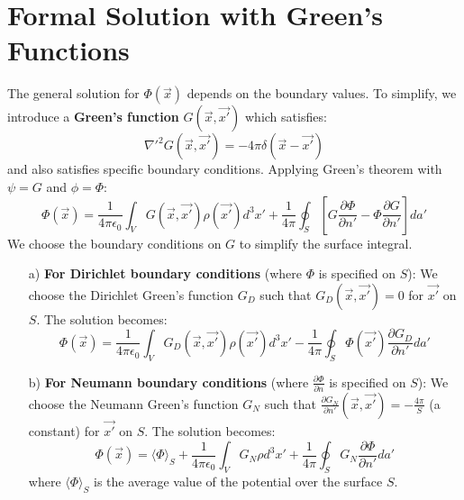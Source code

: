 \documentclass[12pt, a4paper]{article}
\begin{document}
	\section{Formal Solution with Green's Functions}
	The general solution for $\Phi(\vec{x})$ depends on the boundary values. To simplify, we introduce a \textbf{Green's function} $G(\vec{x}, \vec{x'})$ which satisfies:
	\begin{equation*}
		\nabla'^2 G(\vec{x}, \vec{x'}) = -4\pi\delta(\vec{x}-\vec{x'})
	\end{equation*}
	and also satisfies specific boundary conditions. Applying Green's theorem with $\psi = G$ and $\phi = \Phi$:
	\begin{equation*}
		\Phi(\vec{x}) = \frac{1}{4\pi\epsilon_0} \int_V G(\vec{x},\vec{x'}) \rho(\vec{x'}) d^3x' + \frac{1}{4\pi} \oint_S \left[G \frac{\partial\Phi}{\partial n'} - \Phi \frac{\partial G}{\partial n'}\right] da'
	\end{equation*}
	We choose the boundary conditions on $G$ to simplify the surface integral.
	\begin{enumerate}
		\item[a)] \textbf{For Dirichlet boundary conditions} (where $\Phi$ is specified on $S$): We choose the Dirichlet Green's function $G_D$ such that $G_D(\vec{x}, \vec{x'}) = 0$ for $\vec{x'}$ on $S$. The solution becomes:
		\begin{equation}
			\boxed{
				\Phi(\vec{x}) = \frac{1}{4\pi\epsilon_0} \int_V G_D(\vec{x},\vec{x'}) \rho(\vec{x'}) d^3x' - \frac{1}{4\pi} \oint_S \Phi(\vec{x'}) \frac{\partial G_D}{\partial n'} da'
			}
		\end{equation}
		
		\item[b)] \textbf{For Neumann boundary conditions} (where $\frac{\partial\Phi}{\partial n}$ is specified on $S$): We choose the Neumann Green's function $G_N$ such that $\frac{\partial G_N}{\partial n'}(\vec{x}, \vec{x'}) = -\frac{4\pi}{S}$ (a constant) for $\vec{x'}$ on $S$. The solution becomes:
		\begin{equation}
			\boxed{
				\Phi(\vec{x}) = \langle\Phi\rangle_S + \frac{1}{4\pi\epsilon_0} \int_V G_N \rho d^3x' + \frac{1}{4\pi} \oint_S G_N \frac{\partial \Phi}{\partial n'} da'
			}
		\end{equation}
		where $\langle\Phi\rangle_S$ is the average value of the potential over the surface $S$.
	\end{enumerate}
	
\end{document}
